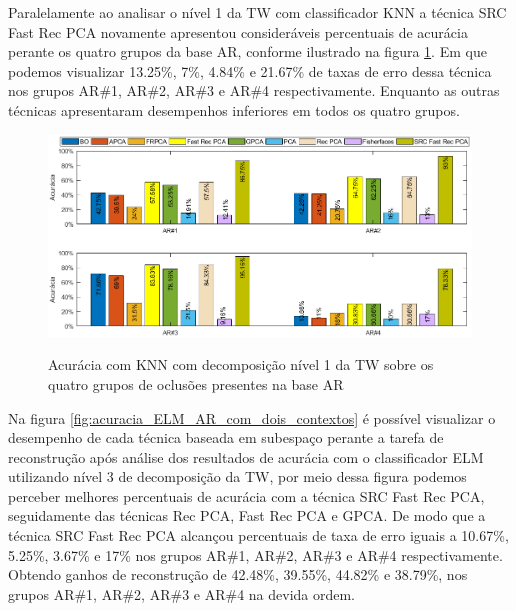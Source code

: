 Paralelamente ao analisar o nível 1 da TW com classificador KNN a técnica SRC Fast Rec PCA novamente apresentou consideráveis percentuais de acurácia perante os quatro grupos da base AR, conforme ilustrado na figura \ref{fig:acuracia_KNN_AR_4_grupos_nivel1}. Em que podemos visualizar 13.25\%, 7\%, 4.84\% e 21.67\% de taxas de erro dessa técnica nos grupos AR\#1, AR\#2, AR\#3 e AR\#4 respectivamente. Enquanto as outras técnicas apresentaram desempenhos inferiores em todos os quatro grupos.

\begin{figure}[H]
\centering
\caption{Acurácia com KNN com decomposição nível 1 da TW sobre os quatro grupos de oclusões presentes na base AR}
\includegraphics[scale=0.56]{imgs4/acuracia/nivel_one_two/knn_nivel1_subespaco}
\label{fig:acuracia_KNN_AR_4_grupos_nivel1}
\end{figure}



Na figura \ref{fig:acuracia_ELM_AR_com_dois_contextos} é possível visualizar o desempenho de cada técnica baseada em subespaço perante a tarefa de reconstrução após análise dos resultados de acurácia com o classificador ELM utilizando nível 3 de decomposição da TW, por meio dessa figura podemos perceber  melhores percentuais de acurácia com a técnica SRC Fast Rec PCA, seguidamente das  técnicas Rec PCA, Fast Rec PCA e GPCA. De modo que a técnica SRC Fast Rec PCA alcançou percentuais de taxa de erro iguais a 10.67\%, 5.25\%, 3.67\% e 17\% nos grupos AR\#1, AR\#2, AR\#3 e AR\#4 respectivamente. Obtendo ganhos de reconstrução de 42.48\%, 39.55\%, 44.82\% e 38.79\%, nos grupos AR\#1, AR\#2, AR\#3 e AR\#4 na devida ordem.

